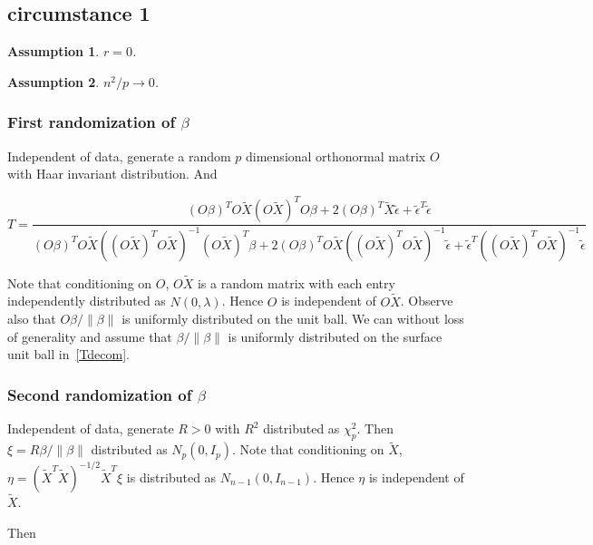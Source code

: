 \documentclass[review]{elsarticle}
\theoremstyle{plain}
\newtheorem{assumption}{\quad\quad Assumption}
\theoremstyle{definition}
\theoremstyle{remark}
\begin{document}
\subsection{circumstance 1}
\begin{assumption}
    $r=0$.
\end{assumption}
\begin{assumption}
    $n^2/p\to 0$.
\end{assumption}

\subsubsection{First randomization of $\beta$}
Independent of data, generate a random $p$ dimensional orthonormal matrix $O$ with Haar invariant distribution. And 

\begin{equation}
    T=\frac{{(O\beta)}^T O\tilde{X}{(O\tilde{X})}^T O\beta+
        2{(O\beta)}^T \tilde{X}\tilde{\epsilon}+
        \tilde{\epsilon}^T\tilde{\epsilon}
    }{{(O\beta)}^T O\tilde{X}{({(O\tilde{X})}^T O\tilde{X})}^{-1}{(O\tilde{X})}^T \beta+
        2{(O\beta)}^T O\tilde{X}{({(O\tilde{X})}^T O\tilde{X})}^{-1}\tilde{\epsilon}+
        \tilde{\epsilon}^T{({(O\tilde{X})}^T O\tilde{X})}^{-1}\tilde{\epsilon}
    }
\end{equation}

Note that conditioning on $O$, $O\tilde{X}$ is a random matrix with each entry independently distributed as $N(0,\lambda)$. Hence $O$ is independent of $O\tilde{X}$. Observe also that $O\beta/\|\beta\|$ is uniformly distributed on the unit ball.  We can without loss of generality and assume that $\beta/\|\beta\|$ is uniformly distributed on the surface unit ball in~\eqref{Tdecom}.

\subsubsection{Second randomization of $\beta$}
Independent of data, generate $R>0$ with $R^2$ distributed as $\chi^2_{p}$. Then $\xi=R\beta/\|\beta\|$ distributed as $N_p(0,I_p)$.
Note that conditioning on $\tilde{X}$, $\eta={(\tilde{X}^T\tilde{X})}^{-1/2}\tilde{X}^T \xi$ is distributed as $N_{n-1}(0,I_{n-1})$. Hence $\eta$ is independent of $\tilde{X}$.

Then
\end{document}
